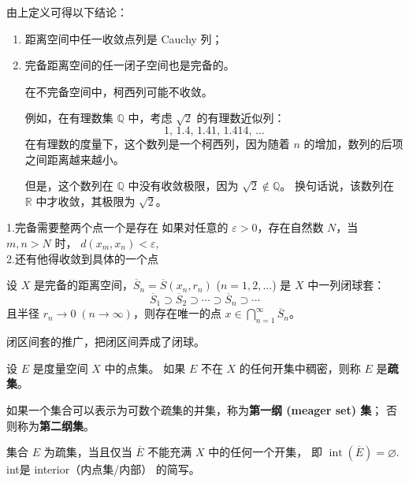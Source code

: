 由上定义可得以下结论：
\begin{enumerate}
  \item 距离空间中任一收敛点列是 Cauchy 列；
  \item 完备距离空间的任一闭子空间也是完备的。

\begin{example}
在不完备空间中，柯西列可能不收敛。

例如，在有理数集 $\mathbb{Q}$ 中，考虑 $\sqrt{2}$ 的有理数近似列：
\[
1,\, 1.4,\, 1.41,\, 1.414,\, \dots
\]
在有理数的度量下，这个数列是一个柯西列，因为随着 $n$ 的增加，数列的后项之间距离越来越小。

但是，这个数列在 $\mathbb{Q}$ 中没有收敛极限，因为 $\sqrt{2}\notin\mathbb{Q}$。
换句话说，该数列在 $\mathbb{R}$ 中才收敛，其极限为 $\sqrt{2}$。
\end{example}
\end{enumerate}
\begin{dxtips}
    1.完备需要整两个点一个是存在
    如果对任意的 $\varepsilon > 0$，存在自然数 $N$，当 $m,n > N$ 时，
$
d(x_m, x_n) < \varepsilon,
$   \\2.还有他得收敛到具体的一个点
\end{dxtips}
\begin{theorem}[闭球套定理]
设 $X$ 是完备的距离空间，$\overline{S}_n = \overline{S}(x_n, r_n)$ ($n=1,2,\dots$) 是 $X$ 中一列闭球套：
\[
\overline{S}_1 \supset \overline{S}_2 \supset \cdots \supset \overline{S}_n \supset \cdots
\]
且半径 $r_n \to 0 \; (n \to \infty)$，则存在唯一的点 $x \in \bigcap_{n=1}^{\infty} \overline{S}_n$。
\end{theorem}
闭区间套的推广，把闭区间弄成了闭球。
\begin{definition}
设 $E$ 是度量空间 $X$ 中的点集。  
如果 $E$ 不在 $X$ 的任何开集中稠密，则称 $E$ 是\textbf{疏集}。  

如果一个集合可以表示为可数个疏集的并集，称为\textbf{第一纲 (meager set) 集}；  
否则称为\textbf{第二纲集}。
\end{definition}
集合 $E$ 为疏集，当且仅当 $\overline{E}$ 不能充满 $X$ 中的任何一个开集，
即
$
\operatorname{int}(\overline{E}) = \varnothing.
$int是 interior（内点集/内部） 的简写。

